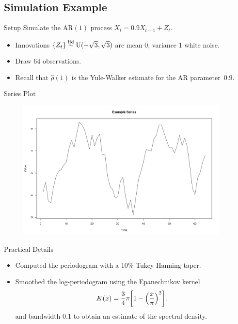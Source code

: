 
\subsection{Simulation Example}
\begin{frame}{Setup}
Simulate the $\textrm{AR}(1)$ process $X_t = 0.9 X_{t-1} + Z_t$.
\begin{itemize}
    \item
    Innovations $\{Z_t\} \overset{\mathrm{iid}}{\sim} \operatorname{U}(-\sqrt{3}, \sqrt{3})$ are
    mean 0, variance 1 white noise.

    \item
    Draw $64$ observations.

    \item
    Recall that $\hat{\rho}(1)$ is the Yule-Walker estimate for the
    AR parameter~$0.9$.

\end{itemize}
\end{frame}

\begin{frame}{Series Plot}
    \begin{figure}
    \centering
    \includegraphics[width = 0.95\textwidth]{res/ex1.png}
    \end{figure}
\end{frame}

\begin{frame}{Practical Details}
\begin{itemize}
    \item
    Computed the periodogram with a $10\%$ Tukey-Hanning taper.
    \item
    Smoothed the log-periodogram using the Epanechnikov kernel
        \[
        K(x) 
        = 
        \frac{3}{4}\pi \biggl[ 1 - \Bigl( \frac{x}{\pi} \Bigr)^2 \biggr].
        \]
    and bandwidth $0.1$ to obtain an estimate of the spectral density.
\end{itemize}
\end{frame}


